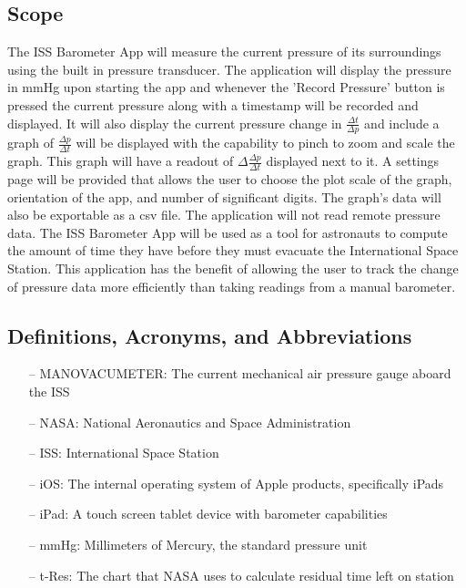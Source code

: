 \documentclass[onecolumn, draftclsnofoot,10pt, compsoc]{IEEEtran}
\def \CapstoneProjectName{ISS Barometer App }
\begin{document}
\subsection{Scope}
The \CapstoneProjectName will measure the current pressure of its surroundings using the built in pressure transducer.
The application will display the pressure in mmHg upon starting the app and whenever the 'Record Pressure' button is pressed the current pressure along with a timestamp will be recorded and displayed.
It will also display the current pressure change in $\frac{\Delta t}{\Delta p}$ and include a graph of $\frac{\Delta p}{\Delta t}$ will be displayed with the capability to pinch to zoom and scale the graph.
This graph will have a readout of $\Delta \frac{\Delta p}{\Delta t}$ displayed next to it.\textbf{}
A settings page will be provided that allows the user to choose the plot scale of the graph, orientation of the app, and number of significant digits.
The graph's data will also be exportable as a csv file.
The application will not read remote pressure data.
The \CapstoneProjectName will be used as a tool for astronauts to compute the amount of time they have before they must evacuate the International Space Station.
This application has the benefit of allowing the user to track the change of pressure data more efficiently than taking readings from a manual barometer.

\subsection{Definitions, Acronyms, and Abbreviations}
\begin{itemize}
\item[--] MANOVACUMETER: The current mechanical air pressure gauge aboard the ISS
\item[--] NASA: National Aeronautics and Space Administration
\item[--] ISS: International Space Station
\item[--] iOS: The internal operating system of Apple products, specifically iPads
\item[--] iPad: A touch screen tablet device with barometer capabilities
\item[--] mmHg: Millimeters of Mercury, the standard pressure unit
\item[--] t-Res: The chart that NASA uses to calculate residual time left on station
\end{itemize}
\end{document}
